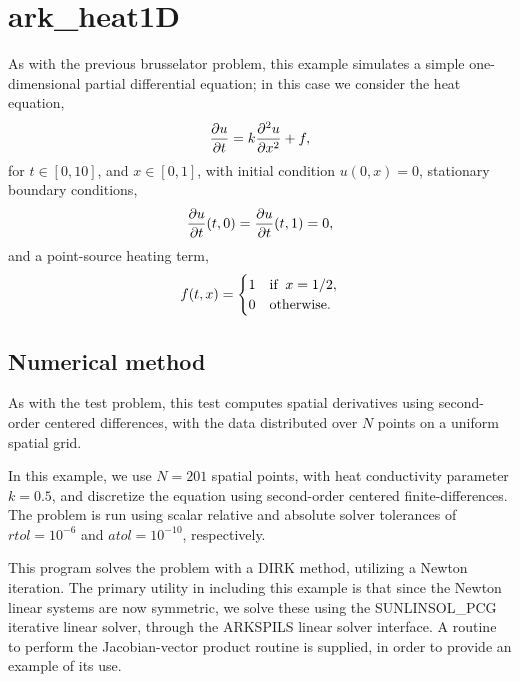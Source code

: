 \documentclass[letterpaper,10pt,english]{sphinxmanual}
\begin{document}
\section{ark\_heat1D}
\label{c_serial:ark-heat1d}\label{c_serial:id23}
As with the previous brusselator problem, this example simulates a
simple one-dimensional partial differential equation; in this case we
consider the heat equation,
\begin{gather}
\begin{split}\frac{\partial u}{\partial t} = k \frac{\partial^2 u}{\partial x^2} + f,\end{split}\notag
\end{gather}
for \(t \in [0, 10]\), and \(x \in [0, 1]\), with initial
condition \(u(0,x) = 0\), stationary boundary conditions,
\begin{gather}
\begin{split}\frac{\partial u}{\partial t}(t,0) = \frac{\partial u}{\partial t}(t,1) = 0,\end{split}\notag
\end{gather}
and a point-source heating term,
\begin{gather}
\begin{split}f(t,x) = \begin{cases} 1 & \text{if}\;\; x=1/2, \\
                       0 & \text{otherwise}. \end{cases}\end{split}\notag
\end{gather}

\subsection{Numerical method}
\label{c_serial:id24}
As with the {\hyperref[c_serial:ark-brusselator1d]{\emph{}}} test problem, this test computes
spatial derivatives using second-order centered differences, with the
data distributed over \(N\) points on a uniform spatial grid.

In this example, we use \(N=201\) spatial points, with heat
conductivity parameter \(k=0.5\), and discretize the equation
using second-order centered finite-differences.  The problem is run
using scalar relative and absolute solver tolerances of
\(rtol=10^{-6}\) and \(atol=10^{-10}\), respectively.

This program solves the problem with a DIRK method, utilizing a Newton
iteration.  The primary utility in including this example is that
since the Newton linear systems are now symmetric, we solve these
using the SUNLINSOL\_PCG iterative linear solver, through the ARKSPILS
linear solver interface.  A routine to perform the Jacobian-vector
product routine is supplied, in order to provide an example of its use.
\end{document}
